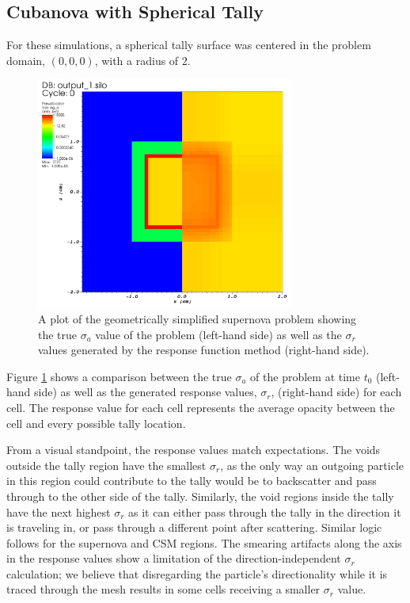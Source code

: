 \documentclass[]{article}
\begin{document}
	\subsection{Cubanova with Spherical Tally}
	
		For these simulations, a spherical tally surface was centered in the problem domain, $(0,0,0)$, with a radius of $2$. 
	
		\begin{figure} [h!]
			\centering
			\includegraphics[height=3in]{Figures/cubanova_op_a.png}
			\caption{A plot of the geometrically simplified supernova problem showing the true $\sigma_{a}$ value of the problem (left-hand side) as well as the $\sigma_{r}$ values generated by the response function method (right-hand side).}
			\label{fig:cubanova_op_a}
		\end{figure}
	
		Figure \ref{fig:cubanova_op_a} shows a comparison between the true $\sigma_{a}$ of the problem at time $t_{0}$ (left-hand side) as well as the generated response values, $\sigma_{r}$, (right-hand side) for each cell. The response value for each cell represents the average opacity between the cell and every possible tally location. 
		
		From a visual standpoint, the response values match expectations. The voids outside the tally region have the smallest $\sigma_{r}$, as the only way an outgoing particle in this region could contribute to the tally would be to backscatter and pass through to the other side of the tally. Similarly, the void regions inside the tally have the next highest $\sigma_{r}$ as it can either pass through the tally in the direction it is traveling in, or pass through a different point after scattering. Similar logic follows for the supernova and CSM regions. The smearing artifacts along the axis in the response values show a limitation of the direction-independent $\sigma_{r}$ calculation; we believe that disregarding the particle's directionality while it is traced through the mesh results in some cells receiving a smaller $\sigma_{r}$ value.
		
\end{document}
